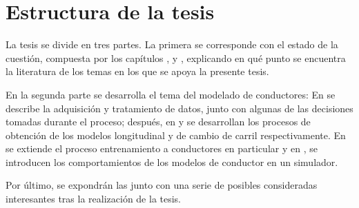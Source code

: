 \section{Estructura de la tesis}
\label{ch:intro:structure}


La tesis se divide en tres partes. La primera se corresponde con el estado de la cuestión, compuesta por los capítulos ,  y , explicando en qué punto se encuentra la literatura de los temas en los que se apoya la presente tesis.

En la segunda parte se desarrolla el tema del modelado de conductores: En  se describe la adquisición y tratamiento de datos, junto con algunas de las decisiones tomadas durante el proceso; después, en  y  se desarrollan los procesos de obtención de los modelos longitudinal y de cambio de carril respectivamente. En  se extiende el proceso entrenamiento a conductores en particular y en , se introducen los comportamientos de los modelos de conductor en un simulador.

Por último, se expondrán las  junto con una serie de posibles  consideradas interesantes tras la realización de la tesis.
